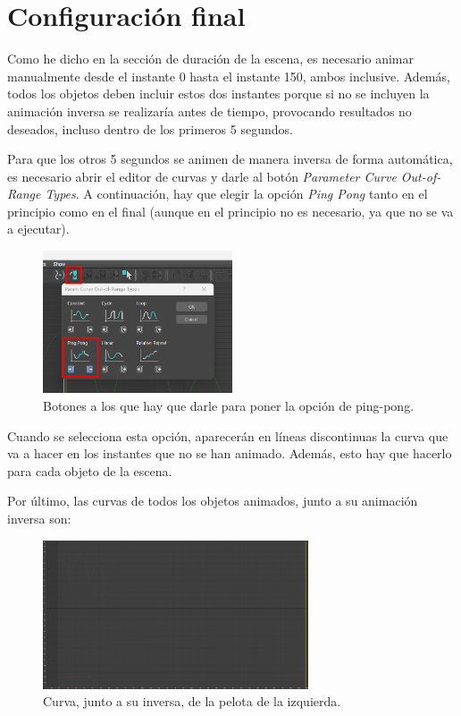 \section{Configuración final}

Como he dicho en la sección de duración de la escena, es necesario animar manualmente desde el instante 0 hasta el instante 150, ambos inclusive. Además, todos los objetos deben incluir estos dos instantes porque si no se incluyen la animación inversa se realizaría antes de tiempo, provocando resultados no deseados, incluso dentro de los primeros 5 segundos.

\bigskip

Para que los otros 5 segundos se animen de manera inversa de forma automática, es necesario abrir el editor de curvas y darle al botón \textit{Parameter Curve Out-of-Range Types}. A continuación, hay que elegir la opción \textit{Ping Pong} tanto en el principio como en el final (aunque en el principio no es necesario, ya que no se va a ejecutar).

\begin{figure}[H]
   \centering
   \includegraphics[width=0.5\textwidth]{imagenes/misc/ping-pong.png}
   \caption{Botones a los que hay que darle para poner la opción de ping-pong.}
\end{figure}

Cuando se selecciona esta opción, aparecerán en líneas discontinuas la curva que va a hacer en los instantes que no se han animado. Además, esto hay que hacerlo para cada objeto de la escena.

\bigskip

Por último, las curvas de todos los objetos animados, junto a su animación inversa son:

\begin{figure}[H]
   \centering
   \includegraphics[width=0.7\textwidth]{imagenes/curvas finales/PL.png}
   \caption{Curva, junto a su inversa, de la pelota de la izquierda.}
\end{figure}

